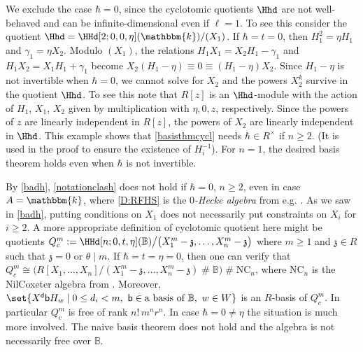 \documentclass[a4paper,11pt]{amsart}
\newcommand\NC{\mathrm{NC}}
\numberwithin{equation}{subsection}
\theoremstyle{definition}
\theoremstyle{theorem}
\theoremstyle{remark}
\newcommand\kapp{{\mathfrak{z}}}
\newcommand\Sym{W}
\newcommand\bd{\mathsf{d}}
\newcommand\bb{\mathsf{b}}
\newcommand\kk{\mathbbm{k}}
\newcommand\RR{R}
\newcommand{\Bo}{\mathbb{B}}
\DeclareMathOperator\Smash{\#}
\begin{document}
\begin{Remark}\label{badh}We exclude the case $\hbar=0$, since the cyclotomic quotients $\Hhd$ are not well-behaved and can be  infinite-dimensional even if $\ell=1$.  To see this consider the quotient $\Hhd=\HHd[2;0, 0, \eta](\kk)/(X_1)$. If  $\hbar=t=0$, then $H_1^2=\eta H_1$ and $\gamma_1=\eta X_2$. Modulo $(X_1)$, the
  relations $H_1X_1=X_2H_1-\gamma_1$ and $H_1X_2=X_1H_1+\gamma_1$ become $X_2(H_1-\eta)\equiv0\equiv(H_1-\eta)X_2$. Since $H_1-\eta$ is not invertible when $\hbar=0$,  we cannot solve for $X_2$ and the powers $X_2^{k}$ survive in the quotient $\Hhd$. To see this note that $R[z]$ is an $\Hhd$-module with the action of $H_1$, $X_1$, $X_2$  given by multiplication with $\eta, 0, z$, respectively. Since the powers of $z$ are linearly independent in $R[z]$, the powers of $X_2$ are  linearly independent in $\Hhd$.
This example shows that \autoref{basisthmcycl} needs $\hbar\in
\RR^\times$ if $n\ge2$. (It is used in the proof to ensure the existence
of $H_i^{-1}$). For $n=1$, the desired basis theorem holds even when
$\hbar$ is not invertible.
    \end{Remark}

\begin{Remark}\label{badh2}
By \autoref{badh}, \autoref{notationclash} does not hold if $\hbar=0$, $n\geq 2$, even  in case $A=\kk$, where \autoref{D:RFHS} is  the  \emph{$0$-Hecke algebra} from e.g. \cite{DGHT, Fayers0Hecke}.
As we saw in \autoref{badh}, putting conditions on $X_1$ does not necessarily put constraints on $X_i$ for $i\geq 2$.
A more appropriate definition of cyclotomic quotient  here might be
quotients $Q^{m}_c:=\HHd[n;0, t,
\eta](\Bo)\big/\bigl(X_1^{m}-\kapp,\dots,X_n^{m}-\kapp\bigr)$
where $m\ge1$ and $\kapp\in R$ such that  $\kapp=0$ or $\theta\mid m$. If  $\hbar=t=\eta=0$, then one can verify that
  $Q^{m}_c\cong\bigl(R[X_1,\dots,X_n]/(X_1^{m}-\kapp,\dots,X_n^{m}-\kapp)\Smash\Bo\bigr)\Smash\NC_n$,
  where $\NC_n$ is the NilCoxeter algebra from \cite{NilCoxeter}. Moreover, $\set{X^{\bd}\bb H_w\mid 0\le d_i<m,\ \bb\in\text{a basis of }\Bo,\ w\in\Sym}$ is an $R$-basis of $Q^{m}_c$. In particular $Q^{m}_c$ is free of rank
  $n!\,m^n r^n$. In case $\hbar=0\not=\eta$ the situation is much
  more involved. The naive basis theorem does not hold and the algebra
  is not necessarily free over $\Bo$.
\end{Remark}
\end{document}
